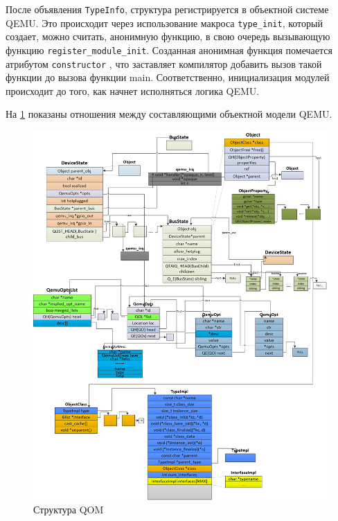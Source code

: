 После объявления \texttt{TypeInfo}, структура регистрируется в объектной системе QEMU.
Это происходит через использование макроса \texttt{type\_init}, который создает, можно считать,
анонимную функцию, в свою очередь вызывающую функцию \texttt{register\_module\_init}.
Созданная анонимная функция помечается атрибутом \texttt{constructor} \cite{gcc-attributes}, что заставляет
компилятор добавить вызов такой функции до вызова функции main.
Соответственно, инициализация модулей происходит до того, как начнет исполняться логика QEMU.

На \cref{fig:qom-structure} показаны отношения между составляющими объектной модели QEMU.

\begin{figure}[!htbp]
    \centering
    \begin{adjustbox}{max totalsize={\textwidth}{\textheight}}
        \includegraphics[]{images/qom-hierarchy_upscaled.png}
    \end{adjustbox}
    \caption{Структура QOM}\label{fig:qom-structure}
\end{figure}


